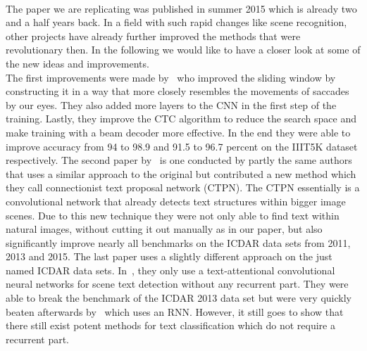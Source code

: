 \documentclass{utue} %
\begin{document}
\\
The paper we are replicating was published in summer 2015 which is already two and a half years back. In a field with such rapid changes like scene recognition, other projects have already further improved the methods that were revolutionary then. In the following we would like to have a closer look at some of the new ideas and improvements. \\
The first improvements were made by~\cite{DBLP:journals/corr/abs-1709-01727} who improved the sliding window by constructing it in a way that more closely resembles the movements of saccades by our eyes. They also added more layers to the CNN in the first step of the training. Lastly, they improve the CTC algorithm to reduce the search space and make training with a beam decoder more effective. In the end they were able to improve accuracy from 94 to 98.9 and 91.5 to 96.7 percent on the IIIT5K dataset respectively. 
The second paper by~\cite{DBLP:journals/corr/TianHHH016} is one conducted by partly the same authors that uses a similar approach to the original but contributed a new method which they call connectionist text proposal network (CTPN). The CTPN essentially is a convolutional network that already detects text structures within bigger image scenes. Due to this new technique they were not only able to find text within natural images, without cutting it out manually as in our paper, but also significantly improve nearly all benchmarks on the ICDAR data sets from 2011, 2013 and 2015.
The last paper uses a slightly different approach on the just named ICDAR data sets. In~\cite{DBLP:journals/corr/HeH0Y15}, they only use a text-attentional convolutional neural networks for scene text detection without any recurrent part. They were able to break the benchmark of the ICDAR 2013 data set but were very quickly beaten afterwards by~\cite{DBLP:journals/corr/TianHHH016} which uses an RNN. However, it still goes to show that there still exist potent methods for text classification which do not require a recurrent part.\\




\end{document}
